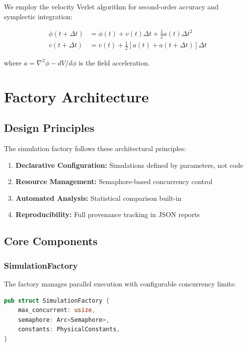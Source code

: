 \documentclass[12pt,a4paper]{article}
\begin{document}
We employ the velocity Verlet algorithm for second-order accuracy and symplectic integration:

\begin{align}
\phi(t + \Delta t) &= \phi(t) + v(t) \Delta t + \frac{1}{2} a(t) \Delta t^2 \\
v(t + \Delta t) &= v(t) + \frac{1}{2} [a(t) + a(t + \Delta t)] \Delta t
\end{align}

where $a = \nabla^2 \phi - dV/d\phi$ is the field acceleration.

\section{Factory Architecture}

\subsection{Design Principles}

The simulation factory follows these architectural principles:

\begin{enumerate}
    \item \textbf{Declarative Configuration:} Simulations defined by parameters, not code
    \item \textbf{Resource Management:} Semaphore-based concurrency control
    \item \textbf{Automated Analysis:} Statistical comparison built-in
    \item \textbf{Reproducibility:} Full provenance tracking in JSON reports
\end{enumerate}

\subsection{Core Components}

\subsubsection{SimulationFactory}

The factory manages parallel execution with configurable concurrency limits:

\begin{lstlisting}[language=Rust, basicstyle=\small\ttfamily]
pub struct SimulationFactory {
    max_concurrent: usize,
    semaphore: Arc<Semaphore>,
    constants: PhysicalConstants,
}
\end{lstlisting}
\end{document}
